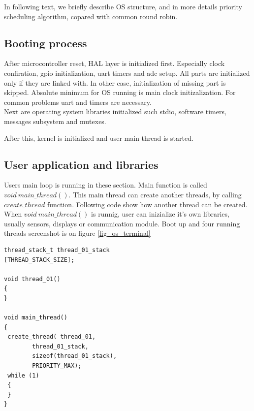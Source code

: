 \documentclass[conference]{IEEEtran}
\begin{document}
In following text, we briefly describe OS structure, and in more details priority scheduling algorithm, copared with common round robin.

\subsection{Booting process}

After microcontroller reset, HAL layer is initialized first. Especially clock confiration, gpio initialization, uart timers and adc setup.
All parts are initialized only if they are linked with. In other case, initialization of missing part is skipped.
Absolute minimum for OS running is main clock initizalization. For common problems uart and timers are necessary.\\
Next are operating system libraries initialized such stdio, software timers, messages subsystem and mutexes.

After this, kernel is initialized and user main thread is started.

\subsection{User application and libraries}

Users main loop is running in these section. Main function is called $void\ main\_thread()$. This main thread can create another threads, by calling $create\_thread$ function. Following code show how another thread can be created. When $void\ main\_thread()$ is runnig, user can inizialize it's own libraries, usually sensors, displays or communication module. Boot up and four running threads screenshot is on figure \ref{fig_os_terminal}

\noindent\begin{minipage}{.45\textwidth}
\lstset{language=C++}    
\begin{lstlisting}[frame=single, caption = thread creating]
thread_stack_t thread_01_stack
[THREAD_STACK_SIZE];

void thread_01()
{
}

void main_thread()
{
 create_thread(	thread_01, 
		thread_01_stack, 
		sizeof(thread_01_stack), 
		PRIORITY_MAX);
 while (1)
 {
 }
}
\end{lstlisting}
\end{minipage}\hfill
\end{document}
